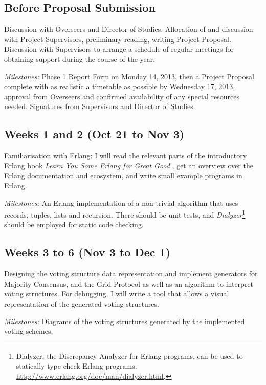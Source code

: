 \documentclass[12pt]{scrartcl}
\begin{document}
\subsection{Before Proposal Submission%
  \label{before-proposals-submission}%
}

Discussion with Overseers and Director of Studies. Allocation of and discussion with Project Supervisors, preliminary reading, writing Project Proposal. Discussion with Supervisors to arrange a schedule of regular meetings for obtaining support during the course of the year.

\emph{Milestones:} Phase 1 Report Form on Monday 14, 2013, then a Project Proposal complete with as realistic a timetable as possible by Wednesday 17, 2013, approval from Overseers and confirmed availability of any special resources needed. Signatures from Supervisors and Director of Studies.


\subsection{Weeks 1 and 2 (Oct 21 to Nov 3)%
  \label{weeks-1-and-2-oct-21-to-nov-3}%
}

Familiarisation with Erlang: I will read the relevant parts of the introductory Erlang book \emph{Learn You Some Erlang for Great Good} \cite{lysefgg}, get an overview over the Erlang documentation and ecosystem, and write small example programs in Erlang.

\emph{Milestones:} An Erlang implementation of a non-trivial algorithm that uses records, tuples, lists and recursion. There should be unit tests, and \emph{Dialyzer}\footnote{Dialyzer, the Discrepancy Analyzer for Erlang programs, can be used to statically type check Erlang programs. \url{http://www.erlang.org/doc/man/dialyzer.html}.} should be employed for static code checking.


\subsection{Weeks 3 to 6 (Nov 3 to Dec 1)%
  \label{weeks-3-to-6-nov-3-to-dec-1}%
}

Designing the voting structure data representation and implement generators for Majority Consensus, and the Grid Protocol as well as an algorithm to interpret voting structures. For debugging, I will write a tool that allows a visual representation of the generated voting structures.

\emph{Milestones:} Diagrams of the voting structures generated by the implemented voting schemes.
\end{document}

